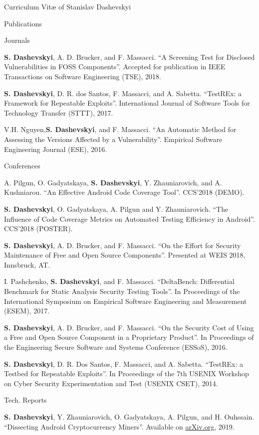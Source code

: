 \documentclass[11pt]{custom-style}
\begin{document}
\begin{cv}{Curriculum Vit\ae{} of Stanislav Dashevskyi}
  \begin{cvlist}{Publications}
  \item[Journals]
    \begin{etaremune}
    \item \textbf{S. Dashevskyi}, A. D. Brucker, and F. Massacci. ``A
      Screening Test for Disclosed Vulnerabilities in FOSS
      Components''. Accepted for publication in IEEE Transactions on
      Software Engineering (TSE), 2018.
    \item \textbf{S. Dashevskyi}, D. R. dos Santos, F. Massacci, and
      A. Sabetta. ``TestREx: a Framework for Repeatable
      Exploits''. International Journal of Software Tools for
      Technology Transfer (STTT), 2017.
    \item V.H. Nguyen,\textbf{S. Dashevskyi}, and F. Massacci. ``An
      Automatic Method for Assessing the Versions Affected by a
      Vulnerability''. Empirical Software Engineering Journal (ESE),
      2016.
    \end{etaremune}
  \item[Conferences]
    \begin{etaremune}
    \item A. Pilgun, O. Gadyatskaya, \textbf{S. Dashevskyi},
      Y. Zhauniarovich, and A. Kushniarou. ``An Effective Android Code
      Coverage Tool''. CCS'2018 (DEMO).
    \item \textbf{S. Dashevskyi}, O. Gadyatskaya, A. Pilgun and
      Y. Zhauniarovich. ``The Influence of Code Coverage Metrics on
      Automated Testing Efficiency in Android''. CCS'2018 (POSTER).
    \item \textbf{S. Dashevskyi}, A. D. Brucker, and F. Massacci. ``On
      the Effort for Security Maintenance of Free and Open Source
      Components''. Presented at WEIS 2018, Innsbruck, AT.
    \item I. Pashchenko, \textbf{S. Dashevskyi}, and
      F. Massacci. ``DeltaBench: Differential Benchmark for Static
      Analysis Security Testing Tools''. In Proceedings of the
      International Symposium on Empirical Software Engineering and
      Measurement (ESEM), 2017.
    \item \textbf{S. Dashevskyi}, A. D. Brucker, and F. Massacci. ``On
      the Security Cost of Using a Free and Open Source Component in a
      Proprietary Product''. In Proceedings of the Engineering Secure
      Software and Systems Conference (ESSoS), 2016.
    \item \textbf{S. Dashevskyi}, D. R. Dos Santos, F. Massacci, and
      A. Sabetta. ``TestREx: a Testbed for Repeatable Exploits''. In
      Proceedings of the 7th USENIX Workshop on Cyber Security
      Experimentation and Test (USENIX CSET), 2014.
    \end{etaremune}
    \item[Tech. Reports]
    \begin{etaremune}
        \item \textbf{S. Dashevskyi}, Y. Zhauniarovich, O. Gadyatskaya, A. Pilgun, and H. Ouhssain. 
            ``Dissecting Android Cryptocurrency Miners''. Available on \href{https://arxiv.org/pdf/1905.02602.pdf}{arXiv.org}, 2019.


\end{etaremune}
\end{cvlist}
\end{cv}
\end{document}
